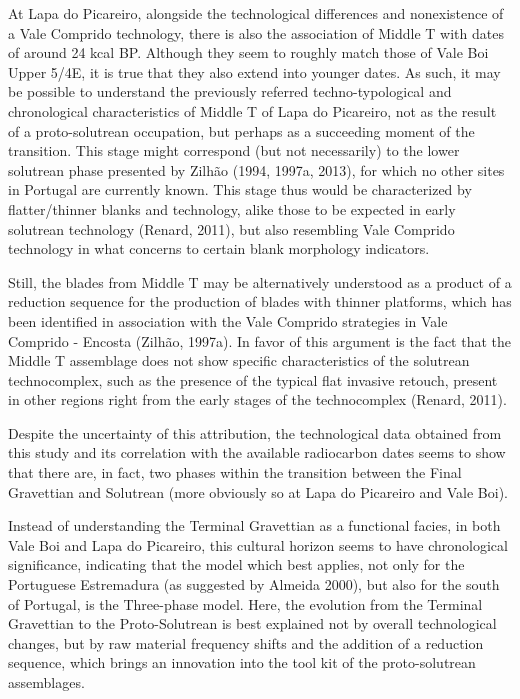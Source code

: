 \documentclass[12pt,twoside]{reedthesis}
\begin{document}
At Lapa do Picareiro, alongside the technological differences and nonexistence of a Vale Comprido technology, there is also the association of Middle T with dates of around 24 kcal BP. Although they seem to roughly match those of Vale Boi Upper 5/4E, it is true that they also extend into younger dates. As such, it may be possible to understand the previously referred techno-typological and chronological characteristics of Middle T of Lapa do Picareiro, not as the result of a proto-solutrean occupation, but perhaps as a succeeding moment of the transition. This stage might correspond (but not necessarily) to the lower solutrean phase presented by Zilhão (1994, 1997a, 2013), for which no other sites in Portugal are currently known. This stage thus would be characterized by flatter/thinner blanks and technology, alike those to be expected in early solutrean technology (Renard, 2011), but also resembling Vale Comprido technology in what concerns to certain blank morphology indicators.

Still, the blades from Middle T may be alternatively understood as a product of a reduction sequence for the production of blades with thinner platforms, which has been identified in association with the Vale Comprido strategies in Vale Comprido - Encosta (Zilhão, 1997a). In favor of this argument is the fact that the Middle T assemblage does not show specific characteristics of the solutrean technocomplex, such as the presence of the typical flat invasive retouch, present in other regions right from the early stages of the technocomplex (Renard, 2011).

Despite the uncertainty of this attribution, the technological data obtained from this study and its correlation with the available radiocarbon dates seems to show that there are, in fact, two phases within the transition between the Final Gravettian and Solutrean (more obviously so at Lapa do Picareiro and Vale Boi).

Instead of understanding the Terminal Gravettian as a functional facies, in both Vale Boi and Lapa do Picareiro, this cultural horizon seems to have chronological significance, indicating that the model which best applies, not only for the Portuguese Estremadura (as suggested by Almeida 2000), but also for the south of Portugal, is the Three-phase model. Here, the evolution from the Terminal Gravettian to the Proto-Solutrean is best explained not by overall technological changes, but by raw material frequency shifts and the addition of a reduction sequence, which brings an innovation into the tool kit of the proto-solutrean assemblages.
\end{document}
